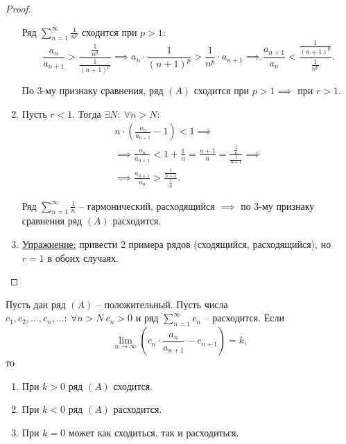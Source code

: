 \begin{proof}
\begin{enumerate}
              Ряд $\sum_{n=1}^{\infty}\frac{1}{n^p}$ сходится при $p > 1$:
              \[
                  \frac{a_n}{a_{n+1}} > \frac{\frac{1}{n^p}}{\frac{1}{(n+1)^p}} \implies a_n \cdot \frac{1}{(n+1)^p} > \frac{1}{n^p} \cdot a_{n+1} \implies \frac{a_{n+1}}{a_n} < \frac{\frac{1}{(n+1)^p}}{\frac{1}{n^p}}.
              \]

              По 3-му признаку сравнения, ряд $(A)$ сходится при $p > 1 \implies$ при $r > 1$.

        \item Пусть $r < 1$. Тогда $\exists N: \ \forall n > N$:
              \begin{multline*}
                  n \cdot \left(\frac{a_n}{a_{n+1}} - 1\right) < 1 \implies \\
                  \implies \frac{a_n}{a_{n+1}} < 1 + \frac{1}{n} = \frac{n+1}{n} = \frac{\frac{1}{n}}{\frac{1}{n+1}} \implies \\
                  \implies \frac{a_{n+1}}{a_n} > \frac{\frac{1}{n+1}}{\frac{1}{n}}.
              \end{multline*}

              Ряд $\sum_{n=1}^{\infty}\frac{1}{n}$ -- гармонический, расходящийся $\implies$ по 3-му признаку сравнения ряд $(A)$ расходится.

        \item \underline{Упражнение:} привести 2 примера рядов (сходящийся, расходящийся), но $r=1$ в обоих случаях.
    \end{enumerate}
\end{proof}

\begin{theorem}
    Пусть дан ряд $(A)$ -- положительный. Пусть числа $c_1,c_2,\ldots,c_n,\ldots: \ \forall n > N \ c_n > 0$ и ряд $\sum_{n=1}^{\infty}c_n$ -- расходится. Если
    \[
        \underset{n\rightarrow\infty}{\lim}\left(c_n \cdot \frac{a_n}{a_{n+1}} - c_{n+1}\right) = k,
    \]
    то
    \begin{enumerate}
        \item При $k > 0$ ряд $(A)$ сходится.
        \item При $k < 0$ ряд $(A)$ расходится.
        \item При $k = 0$ может как сходиться, так и расходиться.
    \end{enumerate}
\end{theorem}

